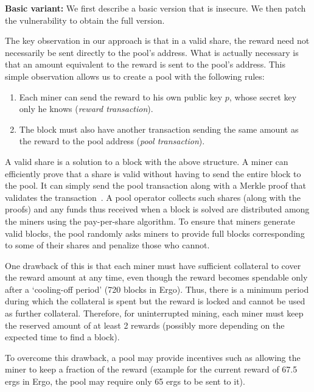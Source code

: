 \documentclass{llncs}
\newcommand{\authnote}[2]{\marginpar{\parbox{\marginparwidth}{\tiny %
  \textsf{#1 {\textcolor{blue}{notes: #2}}}}}%
  \textcolor{blue}{\textbf{\dag}}}
\newcommand{\authnote}[2]{
  \textsf{#1 \textcolor{blue}{: #2}}}
\newcommand{\authnote}[2]{}
\newcommand{\snote}[1]{{\authnote{\textcolor{red}{Scalahub notes}}{#1}}}
\begin{document}
\textbf{Basic variant:} We first describe a basic version that is insecure. We then patch the vulnerability to obtain the full version.

The key observation in our approach is that in a valid share, the reward need not necessarily be sent directly to the pool's address. What is actually necessary is that an amount equivalent to the reward is sent to the pool's address. This simple observation allows us to create a pool with the following rules:
\begin{enumerate}
	\item Each miner can send the reward to his own public key $p$, whose secret key only he knows ({\em reward transaction}).
	\item The block must also have another transaction sending the same amount as the reward to the pool address ({\em pool transaction}). 

\end{enumerate}


A valid share is a solution to a block with the above structure. A miner can efficiently prove that a share is valid without having to send the entire block to the pool. It can simply send the pool transaction along with a Merkle proof that validates the transaction~\cite{Hearn:2012:BIP}.
A pool operator collects such shares (along with the proofs) and any funds thus received when a block is solved are distributed among the miners using the pay-per-share algorithm. To ensure that miners generate valid blocks, the pool randomly asks miners to provide full blocks corresponding to some of their shares and penalize those who cannot. 

One drawback of this is that each miner must have sufficient collateral to cover the reward amount at any time, even though the reward becomes spendable only after a `cooling-off period' (720 blocks in Ergo). Thus, there is a minimum period during which the collateral is spent but the reward is locked and cannot be used as further collateral. 
Therefore, for uninterrupted mining, each miner must keep the reserved amount of at least 2 rewards (possibly more depending on the expected time to find a block).

 To overcome this drawback, a pool may provide incentives such as allowing the miner to keep a fraction of the reward (example for the current reward of 67.5 ergs in Ergo, the pool may require only 65 ergs to be sent to it). 
\end{document}
